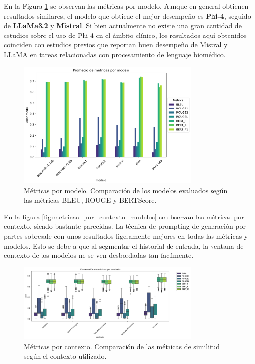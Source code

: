 \documentclass[../main.tex]{subfiles}
\begin{document}
En la Figura \ref{fig:metricas_por_modelo} se observan las métricas por modelo. Aunque en general obtienen resultados similares, el modelo que obtiene el mejor desempeño es \textbf{Phi-4}, seguido de \textbf{LLaMa3.2} y \textbf{Mistral}. 
Si bien actualmente no existe una gran cantidad de estudios sobre el uso de Phi-4 en el ámbito clínico, los resultados aquí obtenidos coinciden con estudios previos que reportan buen desempeño de Mistral \parencite{zhang2024mistral} y LLaMA \parencite{ji2024llama3deepseek} en tareas relacionadas con procesamiento de lenguaje biomédico.

\begin{figure}[H]
    \centering
    \includegraphics[width=0.8\textwidth]{images/metricas_por_modelo.png}
    \caption{Métricas por modelo. Comparación de los modelos evaluados según las métricas BLEU, ROUGE y BERTScore.}
    \label{fig:metricas_por_modelo}
\end{figure}

En la figura \ref{fig:metricas_por_contexto_modelos} se observan las métricas por contexto, siendo bastante parecidas. La técnica de prompting de generación por partes sobresale con unos resultados ligeramente mejores en todas las métricas y modelos. Esto se debe a que al segmentar el historial de entrada, la ventana de contexto de los modelos no se ven desbordadas tan facilmente.

\begin{figure}[H]
    \centering
    \includegraphics[width=0.8\textwidth]{images/metricas_por_contexto.png}
    \caption{Métricas por contexto. Comparación de las métricas de similitud según el contexto utilizado.}
    \label{fig:metricas_por_contexto}
\end{figure}
\end{document}
